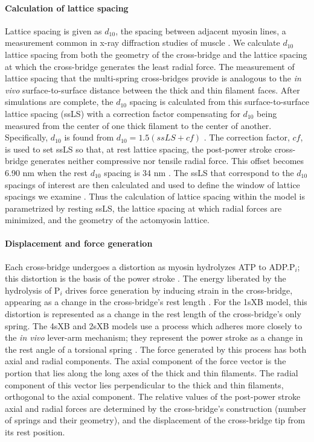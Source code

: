 \documentclass[]{article}
\begin{document}
\paragraph{Calculation of lattice spacing} %
Lattice spacing is given as $d_{10}$, the spacing between adjacent myosin lines, a measurement common in x-ray diffraction studies of muscle \citep{Millman1998}.
We calculate $d_{10}$ lattice spacing from both the geometry of the cross-bridge and the lattice spacing at which the cross-bridge generates the least radial force. 
The measurement of lattice spacing that the multi-spring cross-bridges provide is analogous to the \emph{in vivo} surface-to-surface distance between the thick and thin filament faces.
After simulations are complete, the $d_{10}$ spacing is calculated from this surface-to-surface lattice spacing (ssLS) with a correction factor compensating for $d_{10}$ being measured from the center of one thick filament to the center of another. 
Specifically, $d_{10}$ is found from $d_{10} = 1.5 (ssLS + cf)$ \citep{Millman1998}. 
The correction factor, $cf$, is used to set ssLS so that, at rest lattice spacing, the post-power stroke cross-bridge generates neither compressive nor tensile radial force.  
This offset becomes 6.90 nm when the rest $d_{10}$ spacing is 34 nm \citep{Brenner1991}. 
The ssLS that correspond to the $d_{10}$ spacings of interest are then calculated and used to define the window of lattice spacings we examine \citep{Millman1998}. 
Thus the calculation of lattice spacing within the model is parametrized by resting ssLS, the lattice spacing at which radial forces are minimized, and the geometry of the actomyosin lattice. 

\paragraph{Displacement and force generation} %
Each cross-bridge undergoes a distortion as myosin hydrolyzes ATP to ADP.P$_i$; this distortion is the basis of the power stroke \citep{Pate1989, Daniel1998, Tanner2007}. 
The energy liberated by the hydrolysis of P$_i$ drives force generation by inducing strain in the cross-bridge, appearing as a change in the cross-bridge's rest length \citep{HowardBook}.  
For the 1sXB model, this distortion is represented as a change in the rest length of the cross-bridge's only spring. 
The 4sXB and 2sXB models use a process which adheres more closely to the \emph{in vivo} lever-arm mechanism; they represent the power stroke as a change in the rest angle of a torsional spring \citep{Reedy2000}.
The force generated by this process has both axial and radial components. 
The axial component of the force vector is the portion that lies along the long axes of the thick and thin filaments. 
The radial component of this vector lies perpendicular to the thick and thin filaments, orthogonal to the axial component. 
The relative values of the post-power stroke axial and radial forces are determined by the cross-bridge's construction (number of springs and their geometry), and the displacement of the cross-bridge tip from its rest position. 
\end{document}
